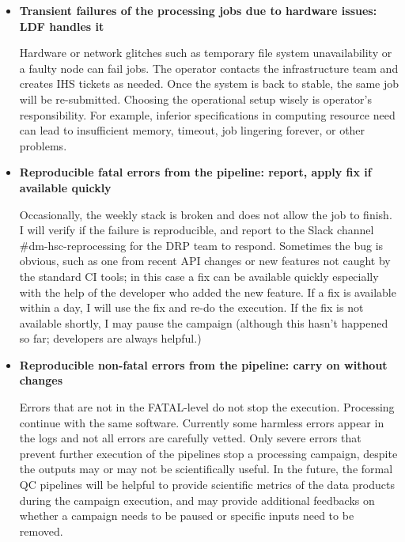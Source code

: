 \documentclass[DM,authoryear,toc]{lsstdoc}
\begin{document}
\begin{itemize}
  \item \textbf{Transient failures of the processing jobs due to
  hardware issues: LDF handles it}

  Hardware or network glitches such as temporary file system
  unavailability or a faulty node can fail jobs. The operator
  contacts the infrastructure team and creates IHS tickets as needed.
  Once the system is back to stable, the same job will be re-submitted.
  Choosing the operational setup wisely is operator’s responsibility.
  For example, inferior specifications in computing resource need
  can lead to insufficient memory, timeout, job lingering forever,
  or other problems.

  \item \textbf{Reproducible fatal errors from the pipeline: report,
  apply fix if available quickly}

  Occasionally, the weekly stack is broken and does not allow the
  job to finish.  I will verify if the failure is reproducible, and
  report to the Slack channel \#dm-hsc-reprocessing for the DRP team
  to respond.  Sometimes the bug is obvious, such as one from recent
  API changes or new features not caught by the standard CI tools;
  in this case a fix can be available quickly especially with the
  help of the developer who added the new feature.  If a fix is
  available within a day, I will use the fix and re-do the execution.
  If the fix is not available shortly, I may pause the campaign
  (although this hasn’t happened so far; developers are always
  helpful.)

  \item \textbf{Reproducible non-fatal errors from the pipeline:
  carry on without changes}

  Errors that are not in the FATAL-level do not stop the execution.
  Processing continue with the same software. Currently some harmless
  errors appear in the logs and not all errors are carefully vetted.
  Only severe errors that prevent further execution of the pipelines
  stop a processing campaign, despite the outputs may or may not
  be scientifically useful. In the future, the formal QC pipelines
  will be helpful to provide scientific metrics of the data products
  during the campaign execution, and may provide additional feedbacks
  on whether a campaign needs to be paused or specific inputs need
  to be removed.

\end{itemize}



\end{document}
